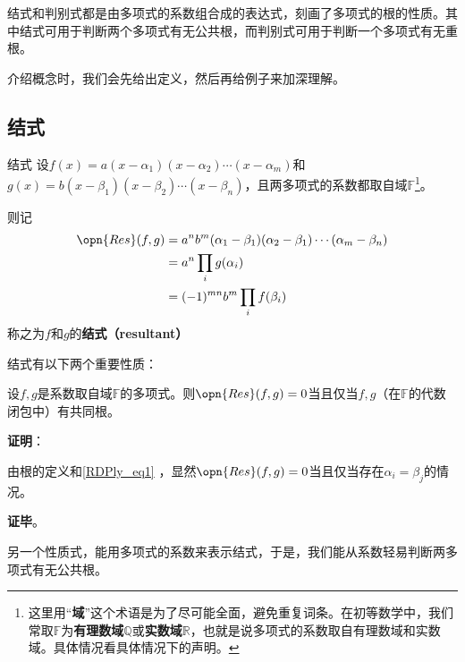 

结式和判别式都是由多项式的系数组合成的表达式，刻画了多项式的根的性质。其中结式可用于判断两个多项式有无公共根，而判别式可用于判断一个多项式有无重根。

介绍概念时，我们会先给出定义，然后再给例子来加深理解。

\subsection{结式}

\begin{definition}{结式}
设$f(x)=a(x-\alpha_1)(x-\alpha_2)\cdots(x-\alpha_m)$和$g(x)=b(x-\beta_1)(x-\beta_2)\cdots(x-\beta_n)$，且两多项式的系数都取自域$\mathbb{F}$\footnote{这里用“\textbf{域}”这个术语是为了尽可能全面，避免重复词条。在初等数学中，我们常取$\mathbb{F}$为\textbf{有理数域}$\mathbb{Q}$或\textbf{实数域}$\mathbb{R}$，也就是说多项式的系数取自有理数域和实数域。具体情况看具体情况下的声明。}。

则记
\begin{equation}\label{RDPly_eq1}
\begin{aligned}
\opn{Res}(f, g)&=a^nb^m(\alpha_1-\beta_1)(\alpha_2-\beta_1)\cdots(\alpha_m-\beta_n)\\
&=a^n\prod_{i} g(\alpha_i)\\
&=(-1)^{mn}b^m\prod_{i} f(\beta_i)
\end{aligned}
\end{equation}
称之为$f$和$g$的\textbf{结式（resultant）}

\end{definition}

结式有以下两个重要性质：

\begin{theorem}{}
设$f, g$是系数取自域$\mathbb{F}$的多项式。则$\opn{Res}(f, g)=0$当且仅当$f, g$（在$\mathbb{F}$的代数闭包中）有共同根。
\end{theorem}

\textbf{证明}：

由根的定义和\autoref{RDPly_eq1} ，显然$\opn{Res}(f, g)=0$当且仅当存在$\alpha_i=\beta_j$的情况。

\textbf{证毕}。


另一个性质式，能用多项式的系数来表示结式，于是，我们能从系数轻易判断两多项式有无公共根。



